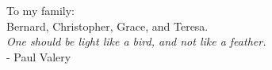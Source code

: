 \begin{dedication}
To my family: \\
Bernard, Christopher, Grace, and Teresa.
\\[200pt]
\textit{One should be light like a bird, and not like a feather.} \\
\hspace{150pt} - Paul Valery
\end{dedication}
